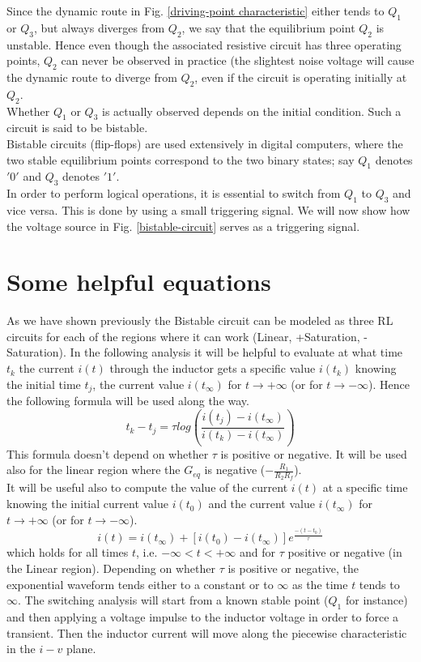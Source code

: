 \documentclass[letterpaper,11pt]{article}
\begin{document}
Since the dynamic route in Fig. \ref{driving-point characteristic} either tends to $Q_1$ or $Q_3$, but always diverges from $Q_2$, we say that the equilibrium point $Q_2$ is unstable. Hence even though the associated resistive circuit has three operating points, $Q_2$ can never be observed in practice (the slightest noise voltage will cause the dynamic route to diverge from $Q_2$, even if the circuit is operating initially at $Q_2$.\\
Whether $Q_1$ or $Q_3$ is actually observed depends on the initial condition. Such a circuit is said to be bistable.\\
Bistable circuits (flip-flops) are used extensively in digital computers, where the two stable equilibrium points correspond to the two binary states; say $Q_1$ denotes $'0'$ and $Q_3$ denotes $'1'$.\\
In order to perform logical operations, it is essential to switch from $Q_1$ to $Q_3$ and vice versa. This is done by using a small triggering signal. We will now show how the voltage source in Fig. \ref{bistable-circuit} serves as a triggering signal.

\section{Some helpful equations}
As we have shown previously the Bistable circuit can be modeled as three RL circuits for each of the regions where it can work (Linear, +Saturation, -Saturation).
In the following analysis it will be helpful to evaluate at what time $t_k$ the current $i(t)$ through the inductor gets a specific value $i(t_k)$ knowing the initial time $t_j$, the current value $i(t_{\infty})$ for $t\rightarrow+\infty$ (or for $t\rightarrow-\infty$). Hence the following formula will be used along the way.
\begin{equation}\label{time-evaluation}
    t_k - t_j=\tau log \left(\frac{i(t_j)-i(t_{\infty})}{i(t_k)-i(t_{\infty})}\right)
\end{equation}
This formula doesn't depend on whether $\tau$ is positive or negative. It will be used also for the linear region where the $G_{eq}$ is negative ($-\frac{R_1}{R_2 R_f}$).\\
It will be useful also to compute the value of the current $i(t)$ at a specific time knowing the initial current value $i(t_0)$ and the current value $i(t_{\infty})$ for $t\rightarrow+\infty$ (or for $t\rightarrow-\infty$).
\begin{equation}
    i(t)=i(t_{\infty}) + [i(t_0)-i(t_{\infty})]e^{\frac{-(t-t_0)}{\tau}}
\end{equation}
which holds for all times $t$, i.e. $-\infty < t < +\infty$ and for $\tau$ positive or negative (in the Linear region).
Depending on whether $\tau$ is positive or negative, the exponential waveform tends either to a constant or to $\infty$ as the time $t$ tends to $\infty$.
The switching analysis will start from a known stable point ($Q_1$ for instance) and then applying a voltage impulse to the inductor voltage in order to force a transient. Then the inductor current will move along the piecewise characteristic in the $i-v$ plane.
%
\end{document}
